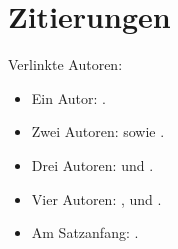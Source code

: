 \documentclass[ngerman]{scrbook}
\begin{document}
\chapter{Zitierungen}
Verlinkte Autoren:

\begin{itemize}
  \item Ein Autor: \citeauthor{ABCD02} \cite{ABCD02}.
  \item Zwei Autoren: \citeauthor{ABC01} \cite{ABC01} sowie \citeauthor{jabref} \cite{jabref}.
  \item Drei Autoren: \citeauthor{AB00} \cite{AB00} und \citeauthor{vdAW2013} \cite{vdAW2013}.
  \item Vier Autoren: \citeauthor{Ez10} \cite{Ez10}, \citeauthor{Go10} \cite{Go10} und \citeauthor{latexcookbook} \cite{latexcookbook}.
  \item Am Satzanfang: .
\end{itemize}

\nocite{*}
\printbibliography
\end{document}
